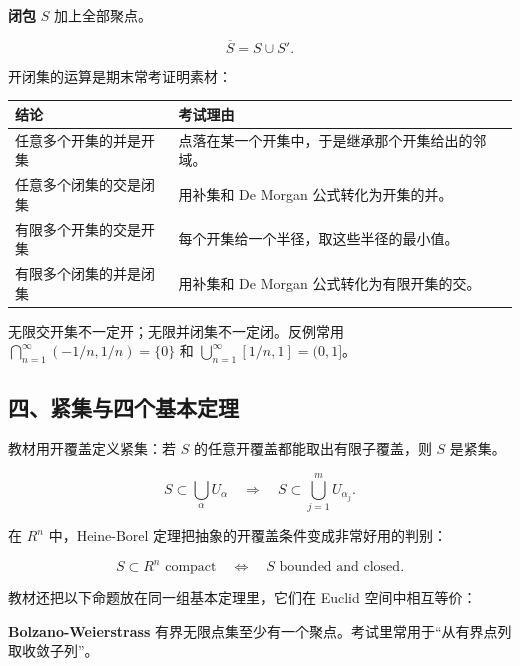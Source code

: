 \begin{conceptbox}
\textbf{闭包}
\(S\) 加上全部聚点。

\[
          \overline S=S\cup S'.
        \]
\end{conceptbox}

开闭集的运算是期末常考证明素材：

\begin{center}
\small
\begin{tabularx}{\linewidth}{|>{\raggedright\arraybackslash}X|>{\raggedright\arraybackslash}X|}
\hline
\textbf{结论} & \textbf{考试理由} \\ \hline
任意多个开集的并是开集 & 点落在某一个开集中，于是继承那个开集给出的邻域。 \\ \hline
任意多个闭集的交是闭集 & 用补集和 De Morgan 公式转化为开集的并。 \\ \hline
有限多个开集的交是开集 & 每个开集给一个半径，取这些半径的最小值。 \\ \hline
有限多个闭集的并是闭集 & 用补集和 De Morgan 公式转化为有限开集的交。 \\ \hline
\end{tabularx}
\end{center}

\begin{notebox}
无限交开集不一定开；无限并闭集不一定闭。反例常用 \(\bigcap_{n=1}^{\infty}(-1/n,1/n)=\{0\}\) 和 \(\bigcup_{n=1}^{\infty}[1/n,1]=(0,1]\)。
\end{notebox}

\subsection*{四、紧集与四个基本定理}

教材用开覆盖定义紧集：若 \(S\) 的任意开覆盖都能取出有限子覆盖，则 \(S\) 是紧集。

\[
      S\subset \bigcup_{\alpha}U_\alpha
      \quad\Rightarrow\quad
      S\subset \bigcup_{j=1}^{m}U_{\alpha_j}.
    \]

在 \(R^n\) 中，Heine-Borel 定理把抽象的开覆盖条件变成非常好用的判别：

\[
      S\subset R^n \text{ compact}
      \quad\Longleftrightarrow\quad
      S \text{ bounded and closed}.
    \]

教材还把以下命题放在同一组基本定理里，它们在 Euclid 空间中相互等价：

\begin{conceptbox}
\textbf{Bolzano-Weierstrass}
有界无限点集至少有一个聚点。考试里常用于“从有界点列取收敛子列”。
\end{conceptbox}


